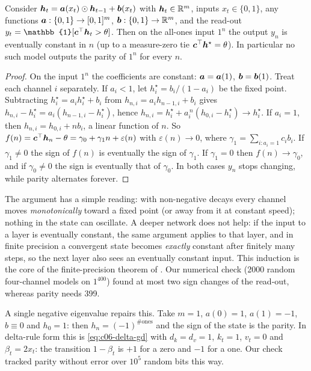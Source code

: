 \begin{proposition}\label{prop:c06-parity}
Consider $\bm{h}_t=\bm{a}(x_t)\odot\bm{h}_{t-1}+\bm{b}(x_t)$ with $\bm{h}_t\in\mathbb{R}^m$, inputs
$x_t\in\{0,1\}$, any functions $\bm{a}:\{0,1\}\to[0,1]^m$, $\bm{b}:\{0,1\}\to\mathbb{R}^m$, and the
read-out $y_t=\mathbb{1}[\bm{c}\T\vh_t>\theta]$. Then on the all-ones input $1^n$ the output
$y_n$ is eventually constant in $n$ (up to a measure-zero tie $\bm{c}^{\top}\bm{h}^\star=\theta$). In
particular no such model outputs the parity of $1^n$ for every $n$.
\end{proposition}

\begin{proof}
On the input $1^n$ the coefficients are constant: $\bm{a}=\bm{a}(1)$, $\bm{b}=\bm{b}(1)$. Treat each
channel $i$ separately.
If $a_i<1$, let $h_i^\star=b_i/(1-a_i)$ be the fixed point. Subtracting
$h_i^\star=a_ih_i^\star+b_i$ from $h_{n,i}=a_ih_{n-1,i}+b_i$ gives
$h_{n,i}-h_i^\star=a_i(h_{n-1,i}-h_i^\star)$, hence
$h_{n,i}=h_i^\star+a_i^{\,n}(h_{0,i}-h_i^\star)\to h_i^\star$.
If $a_i=1$, then $h_{n,i}=h_{0,i}+nb_i$, a linear function of $n$.
So $f(n)=\bm{c}^{\top}\bm{h}_n-\theta=\gamma_0+\gamma_1 n+\varepsilon(n)$ with $\varepsilon(n)\to0$,
where $\gamma_1=\sum_{i:a_i=1}c_ib_i$. If $\gamma_1\neq0$ the sign of $f(n)$ is
eventually the sign of $\gamma_1$. If $\gamma_1=0$ then $f(n)\to\gamma_0$, and if
$\gamma_0\ne0$ the sign is eventually that of $\gamma_0$. In both cases $y_n$ stops
changing, while parity alternates forever.
\end{proof}

The argument has a simple reading: with non-negative decays every channel moves
\emph{monotonically} toward a fixed point (or away from it at constant speed); nothing in the
state can oscillate. A deeper network does not help: if the input to a layer is eventually
constant, the same argument applies to that layer, and in finite precision a convergent
state becomes \emph{exactly} constant after finitely many steps, so the next layer also sees
an eventually constant input. This induction is the core of the finite-precision theorem of
\citet{c03-grazzi2025unlocking}. Our numerical check (2000 random four-channel models on
$1^{400}$) found at most two sign changes of the read-out, whereas parity needs 399.

A single negative eigenvalue repairs this. Take $m=1$, $a(0)=1$, $a(1)=-1$, $b\equiv0$
and $h_0=1$: then $h_n=(-1)^{\#\text{ones}}$ and the sign of the state is the parity. In
delta-rule form this is \eqref{eq:c06-delta-gd} with $d_k=d_v=1$, $k_t=1$, $v_t=0$ and
$\beta_t=2x_t$: the transition $1-\beta_t$ is $+1$ for a zero and $-1$ for a one. Our check
tracked parity without error over $10^5$ random bits this way.

